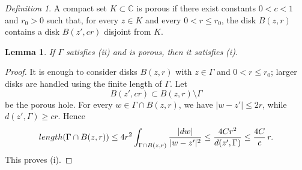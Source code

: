 \documentclass[11pt]{article}
\numberwithin{equation}{section}
\newtheorem{lemma}[theorem]{Lemma}
\theoremstyle{remark}
\newtheorem*{definition}{Definition}
\begin{document}
\begin{definition} A compact set $K\subset\mathbb C$ is porous if there
exist constants $0<c<1$ and $r_0>0$ such that, for every $z\in K$ and every
$0<r\le r_0$, the disk $B(z,r)$ contains a disk $B(z',cr)$ disjoint from $K$.
\end{definition}
\begin{lemma}\label{poro} 
If $\Gamma$ satisfies \rm(ii) and is porous, then it
satisfies \rm(i).
\end{lemma}
\begin{proof}
It is enough to consider disks \(B(z,r)\) with \(z\in\Gamma\) and
\(0<r\le r_0\); larger disks are handled using the finite length of
\(\Gamma\). Let
\[
  B(z',cr)\subset B(z,r)\setminus\Gamma
\]
be the porous hole. For every \(w\in\Gamma\cap B(z,r)\), we have
\(|w-z'|\le2r\), while \(d(z',\Gamma)\ge cr\). Hence
\[
\begin{aligned}
 {\rm length}(\Gamma\cap B(z,r)) \le 4r^2
   \int_{\Gamma\cap B(z,r)}
   \frac{|dw|}{|w-z'|^2} \le \frac{4Cr^2}{d(z',\Gamma)}
 \le \frac{4C}{c}\,r.
\end{aligned}
\]
This proves (i).
\end{proof}
\end{document}

